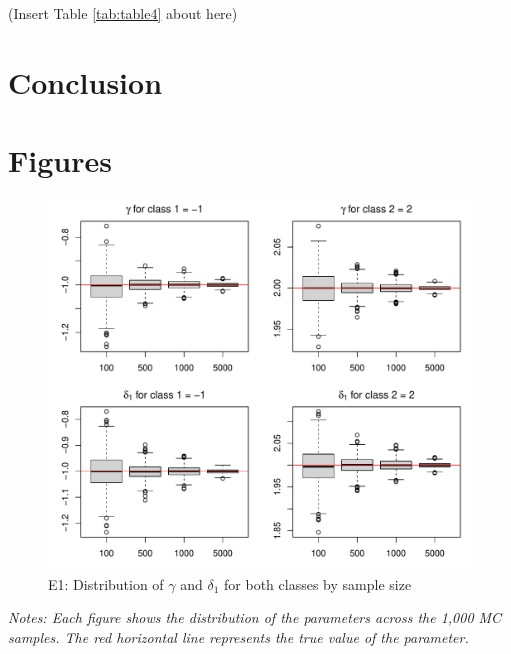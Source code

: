 \documentclass[12pt]{article}
\begin{document}
\begin{center}
	(Insert Table \ref{tab:table4} about here)
\end{center}

\section{Conclusion}


\pagebreak


\newpage

\section*{Figures}

\begin{figure}[H]
	\caption{E1: Distribution of $\gamma$ and $\delta_1$ for both classes by sample size}\label{fig:figure1}
	\centering
	\includegraphics[width =\textwidth]{fig1} 
\end{figure}
\noindent \textsl{Notes: Each figure shows the distribution of the parameters across the 1,000 MC samples. The red horizontal line represents the true value of the parameter.}
\end{document}
